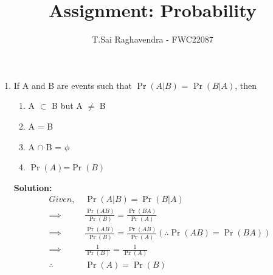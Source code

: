\documentclass{article}
\providecommand{\pr}[1]{\ensuremath{\Pr\left(#1\right)}}
\newcommand{\solution}{\noindent \textbf{Solution: }}
\begin{document}
\title{Assignment: Probability}
\author{\Large T.Sai Raghavendra - FWC22087}
\date{}


\maketitle
\begin{enumerate}[label=13.\arabic{enumi}.\arabic{enumii}]%
\setcounter{enumi}{0}
\setcounter{enumii}{17}


\item If A and B are events such that \pr{A|B} = \pr{B|A}, then\\
\begin{enumerate}
\item A $\subset$ B but A $\not=$ B
\item A = B
\item A $\cap$ B = $\phi$
\item \pr{A}=\pr{B}
\end{enumerate}

\solution \begin{align}
Given, & \;\pr{A|B} = \pr{B|A}\\
\implies& \; \frac{\pr{AB}}{\pr{B}} = \frac{\pr{BA}}{\pr{A}}\\ 
\implies& \; \frac{\pr{AB}}{\pr{B}} = \frac{\pr{AB}}{\pr{A}} (\therefore \pr{AB} = \pr{BA})\\
\implies& \; \frac{1}{\pr{B}} = \frac{1}{\pr{A}}\\
\therefore& \; \pr{A}=\pr{B}
\end{align}
\end{enumerate}
\end{document}
